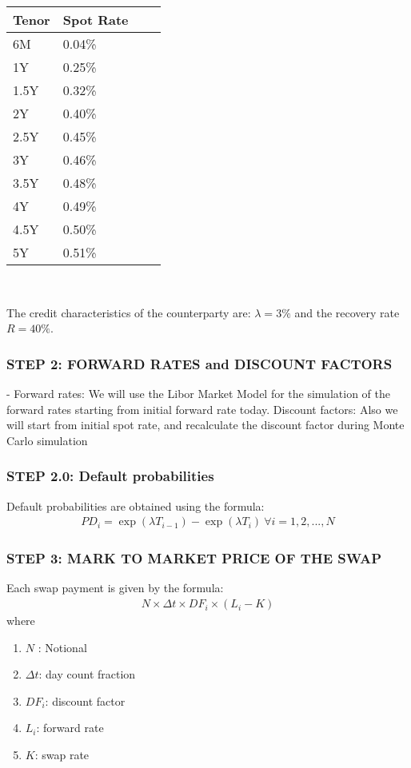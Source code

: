 \documentclass[11pt]{article}
\numberwithin{equation}{subsection}
\begin{document}
\vskip 0.2cm 		
{
	\centering
	\begin{tabular}{|l|l|l|l|}
		\hline
		Tenor & Spot Rate \\		
		\hline		
		6M	  &  0.04\%  \\
		\hline		
		1Y	  &  0.25\%  \\  
		\hline		
		1.5Y  &  0.32\%  \\
		\hline		
		2Y	  &  0.40\%  \\
		\hline		
		2.5Y  &  0.45\%  \\
		\hline		
		3Y	  &  0.46\%  \\
		\hline		
		3.5Y  &  0.48\%  \\
		\hline		
		4Y	  &  0.49\%  \\
		\hline		
		4.5Y  &  0.50\%  \\
		\hline		
		5Y	  &  0.51\%  \\
		\hline				 				
	\end{tabular}
}
\vskip 0.4cm\

\noindent The credit characteristics of the counterparty are:
\(\lambda=3\%\) and the recovery rate \(R=40\%\). 
\subsubsection{STEP 2: FORWARD RATES and DISCOUNT FACTORS}
- Forward rates:  We will use the Libor Market Model for the simulation of the forward rates starting from initial forward rate today.
\noindent Discount factors: Also we will start from initial spot rate, and recalculate the discount factor during Monte Carlo simulation
\subsubsection{STEP 2.0: Default probabilities}
\noindent Default probabilities are obtained using the formula:
\begin{eqnarray*}
	PD_{i}= \exp(\lambda T_{i-1})-\exp(\lambda T_{i}) \ \forall i =1,2,...,N
\end{eqnarray*}

\subsubsection{STEP 3: MARK TO MARKET PRICE OF THE SWAP}
Each swap payment is given by the formula:
\begin{eqnarray*}
	N \times \Delta t \times DF_i \times (L_i - K) 
\end{eqnarray*}
where 
\begin{enumerate}
\item \(N\) : Notional
\item \(\Delta t\): day count fraction
\item \(DF_i\): discount factor
\item \(L_i\): forward rate
\item \(K\): swap rate 
\end{enumerate}
\end{document}
